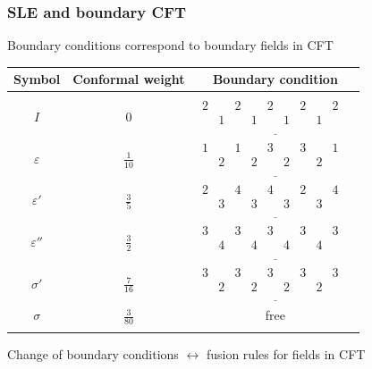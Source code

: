 \documentclass[pdftex]{beamer}
\theoremstyle{definition} \newtheorem{Def}{Definition}
\begin{document}
\begin{frame}
  \frametitle{SLE and boundary CFT}
  Boundary conditions correspond to boundary fields in CFT
  \begin{table}[h]
    \centering
    \begin{tabular}{|c|c|c|}
      \hline
      Symbol & Conformal weight &  Boundary condition\\
      \hline
&&\\
      $I$ & $0$ &
      $\underline{\begin{array}{llllllllll}
            2 & & 2 &  & 2 &  & 2 &  & 2\\
            & 1 & & 1 &  & 1 &   & 1 & & \\
          \end{array}}$\\

      $\varepsilon$ & $\frac{1}{10}$ &
      $\underline{\begin{array}{llllllllll}
            1 & & 1 &  & 3 &  & 3 &  & 1\\
            & 2 & & 2 &  & 2 &   & 2 & & \\
          \end{array}}$\\

      $\varepsilon'$ & $\frac{3}{5}$ &
      $\underline{\begin{array}{llllllllll}
            2 & & 4 &  & 4 &  & 2 &  & 4\\
            & 3 & & 3 &  & 3 &   & 3 & & \\
          \end{array}}$\\

      $\varepsilon''$ & $\frac{3}{2}$ &
      $\underline{\begin{array}{llllllllll}
            3 & & 3 &  & 3 &  & 3 &  & 3\\
            & 4 & & 4 &  & 4 &   & 4 & & \\
          \end{array}}$\\
      $\sigma'$ & $\frac{7}{16}$ &
      $\underline{\begin{array}{llllllllll}
            3 & & 3 &  & 3 &  & 3 &  & 3\\
            & 2 & & 2 &  & 2 &   & 2 & & \\
          \end{array}}$\\

      $\sigma$ & $\frac{3}{80}$ & free\\
&&\\
\hline
    \end{tabular}
    \label{tab:bcc}
  \end{table}
  Change of boundary conditions $\leftrightarrow$ fusion rules for fields in CFT
\end{frame}
\end{document}
